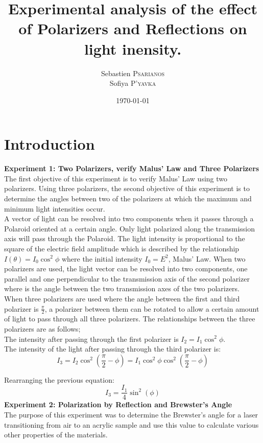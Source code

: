 \documentclass[
	letterpaper, %
	10pt, %
]{CSUniSchoolLabReport}
\title{Experimental analysis of the effect of Polarizers and Reflections on light inensity.}
\author{Sebastien \textsc{Psarianos}\\ Sofiya \textsc{P'yavka}}
\date{\today}
\begin{document}
\maketitle

\section{Introduction}
\textbf{Experiment 1: Two Polarizers, verify Malus' Law and Three Polarizers}
The first objective of this experiment is to verify Malus' Law using two polarizers. Using three polarizers, the second objective of this experiment is to determine the angles between two of the polarizers at which the maximum and minimum light intensities occur.\\

A vector of light can be resolved into two components when it passes through a Polaroid oriented at a certain angle. Only light polarized along the transmission axis will pass through the Polaroid. The light intensity is proportional to the square of the electric field amplitude which is described by the relationship $I(\theta)= I_0\cos^2\phi$ where the initial intensity $I_0=E^2$, Malus' Law. When two polarizers are used, the light vector can be resolved into two components, one parallel and one perpendicular to the transmission axis of the second polarizer where  is the angle between the two transmission axes of the two polarizers.\\

When three polarizers are used where the angle between the first and third polarizer is $\frac \pi2$, a polarizer between them can be rotated to allow a certain amount of light to pass through all three polarizers. The relationships between the three polarizers are as follows;\\

The intensity after passing through the first polarizer is $I_2=I_1\cos^2\phi$.\\

The intensity of the light after passing through the third polarizer is:
$$I_3=I_2\cos^2\left(\frac \pi2 - \phi\right)=I_1\cos^2\phi\cos^2\left(\frac\pi2 - \phi\right)$$

Rearranging the previous equation:
$$I_3=\frac{I_1}4\sin^2(\phi)$$
\newpage
\textbf{Experiment 2: Polarization by Reflection and Brewster's Angle}\\
The purpose of this experiment was to determine the Brewster's angle for a laser transitioning
from air to an acrylic sample and use this value to calculate various other properties of the materials.\\
\end{document}
